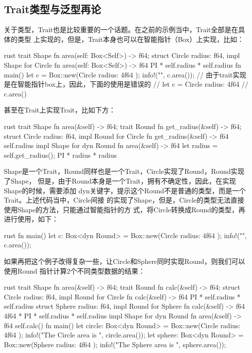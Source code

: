 \subsection{Trait类型与泛型再论}
关于类型，Trait也是比较重要的一个话题。在之前的示例当中，Trait全部是在具体的类型
上实现的，但是，Trait本身也可以在智能指针（Box）上实现，比如：
\begin{code-block}{rust}
trait Shape {
    fn area(self: Box<Self>) -> f64;
}
struct Circle {
    radius: f64,
}
impl Shape for Circle {
    fn area(self: Box<Self>) -> f64 {
        PI * self.radius * self.radius
    }
}
fn main() {
    let c = Box::new(Circle { radius: 4f64 });
    info!("{}", c.area());
    // 由于trait实现是在智能指针box上，因此，下面的使用是错误的
    // let c = Circle { radius: 4f64 }
    // c.area()
}
\end{code-block}
甚至在Trait上实现Trait，比如下方：
\begin{code-block}{rust}
trait Shape {
    fn area(&self) -> f64;
}
trait Round {
    fn get_radius(&self) -> f64;
}
struct Circle {
    radius: f64,
}
impl Round for Circle {
    fn get_radius(&self) -> f64 {
        self.radius
    }
}
impl Shape for dyn Round {
    fn area(&self) -> f64 {
        let radius = self.get_radius();
        PI * radius * radius
    }
}
\end{code-block}
Shape是一个Trait，Round同样也是一个Trait，Circle实现了Round，Round实现了Shape，
但是，由于Round本身是一个Trait，拥有不确定性，因此，在实现Shape的时候，需要添加
dyn关键字，提示这个Round不是普通的类型，而是一个Trait。上述代码当中，Circle间接
的实现了Shape，但是，Circle的类型无法直接使用Shape的方法，只能通过智能指针的方
式，将Circle转换成Round的类型，再进行使用，如下：
\begin{code-block}{rust}
fn main() {
    let c: Box<dyn Round> = Box::new(Circle { radius: 4f64 });
    info!("{}", c.area());
}
\end{code-block}
如果再把这个例子改得复杂一些，让Circle和Sphere同时实现Round，则我们可以使用Round
指针计算2个不同类型数据的结果：
\begin{code-block}{rust}
trait Shape {
    fn area(&self) -> f64;
}
trait Round {
    fn calc(&self) -> f64;
}
struct Circle {
    radius: f64,
}
impl Round for Circle {
    fn calc(&self) -> f64 {
        PI * self.radius * self.radius
    }
}
struct Sphere {
    radius: f64,
}
impl Round for Sphere {
    fn calc(&self) -> f64 {
        4f64 * PI * self.radius * self.radius
    }
}
impl Shape for dyn Round {
    fn area(&self) -> f64 {
        self.calc()
    }
}
fn main() {
    let circle: Box<dyn Round> = Box::new(Circle { radius: 4f64 });
    info!("The Circle area is {}", circle.area());
    let sphere: Box<dyn Round> = Box::new(Sphere { radius: 4f64 });
    info!("The Sphere area is {}", sphere.area());
}
\end{code-block}

